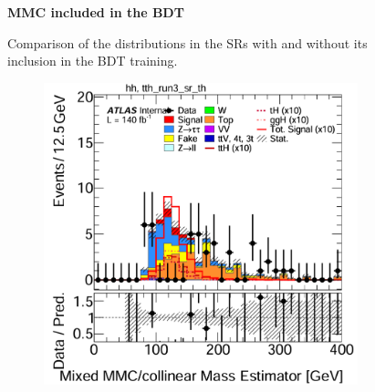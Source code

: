 \begin{figure}[htbp]
\begin{subfigure}[t]{0.45\textwidth}
  \end{subfigure}

  \vspace{0.2cm}
  \begin{minipage}{\textwidth}
    \centering
    \small{\textbf{MMC included in the BDT}}
  \end{minipage}
  \vspace{0.35cm}
  \caption{Comparison of the \mmc distributions in the \ttH SRs with and without its inclusion in the BDT training.}
  \label{mmc_distributions_tth}
\end{figure}


\begin{figure}[htbp]
  \centering
  \begin{subfigure}[t]{0.45\textwidth}
    \centering
    \includegraphics[width=\linewidth]{images/mmc_th_tth/run_2_wo_mmc_th.png}
  \end{subfigure}
  \hfill
  \begin{subfigure}[t]{0.45\textwidth}
    \centering

\end{subfigure}
\end{figure}
